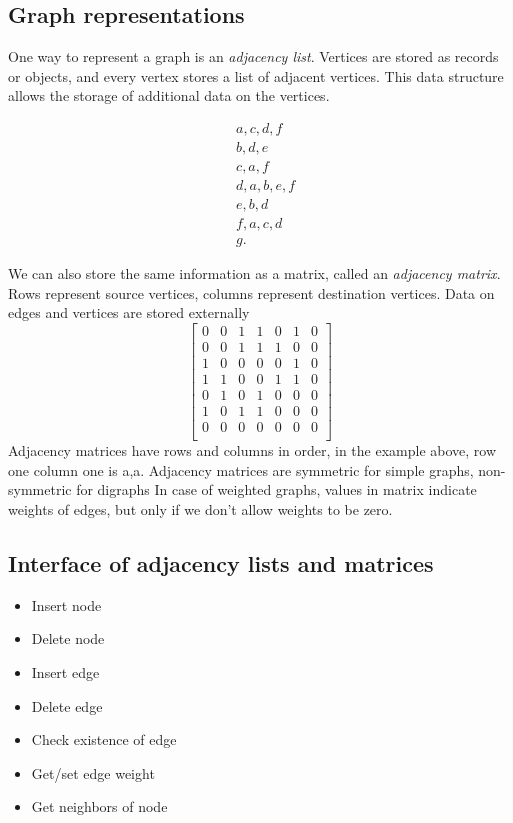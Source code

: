 \documentclass{report}
\begin{document}
\subsection{Graph representations}
\bigbreak \noindent 
One way to represent a graph is an \textit{adjacency list}. Vertices are stored as records or objects, and every vertex stores a list of adjacent vertices.
\bigbreak \noindent 
This data structure allows the storage of additional data on the vertices.
\bigbreak \noindent 
\begin{minipage}[]{0.47\textwidth}
\end{minipage}
\begin{minipage}[]{0.47\textwidth}
\begin{align*}
    &a,c,d,f \\
    &b, d, e \\
    &c, a, f \\
    &d, a, b, e, f \\
    &e,b,d \\ 
    &f,a,c,d \\
    &g
.\end{align*}
\end{minipage}
\bigbreak \noindent 
We can also store the same information as a matrix, called an \textit{adjacency matrix}. Rows represent source vertices, columns represent destination vertices. Data on edges and vertices are stored externally
\bigbreak \noindent 
\[
\begin{bmatrix}
0 & 0 & 1 & 1 & 0 & 1 & 0 \\
0 & 0 & 1 & 1 & 1 & 0 & 0 \\
1 & 0 & 0 & 0 & 0 & 1 & 0 \\
1 & 1 & 0 & 0 & 1 & 1 & 0 \\
0 & 1 & 0 & 1 & 0 & 0 & 0 \\
1 & 0 & 1 & 1 & 0 & 0 & 0 \\
0 & 0 & 0 & 0 & 0 & 0 & 0 \\
\end{bmatrix}
\]
\bigbreak \noindent 
Adjacency matrices have rows and columns in order, in the example above, row one column one is a,a. 
\bigbreak \noindent 
Adjacency matrices are symmetric for simple graphs, non-symmetric for digraphs
\bigbreak \noindent 
In case of weighted graphs, values in matrix indicate weights of edges, but only if we don't allow weights to be zero.
\bigbreak \noindent 
\subsection{Interface of adjacency lists and matrices}
\bigbreak \noindent 
\begin{itemize}
    \item Insert node
    \item Delete node
    \item Insert edge
    \item Delete edge
    \item Check existence of edge
    \item Get/set edge weight
    \item Get neighbors of node
\end{itemize}
\end{document}
